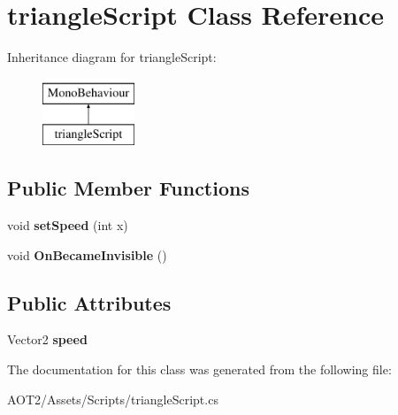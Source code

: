 \hypertarget{classtriangle_script}{}\section{triangle\+Script Class Reference}
\label{classtriangle_script}
Inheritance diagram for triangle\+Script\+:\begin{figure}[H]
\begin{center}
\leavevmode
\includegraphics[height=2.000000cm]{classtriangle_script}
\end{center}
\end{figure}
\subsection*{Public Member Functions}
\begin{DoxyCompactItemize}
\item 
\hypertarget{classtriangle_script_af0cdc29765b1f5485b035e8b025371eb}{}void {\bfseries set\+Speed} (int x)\label{classtriangle_script_af0cdc29765b1f5485b035e8b025371eb}

\item 
\hypertarget{classtriangle_script_a6deb98a0bb688a322a75d03e61e6e5e8}{}void {\bfseries On\+Became\+Invisible} ()\label{classtriangle_script_a6deb98a0bb688a322a75d03e61e6e5e8}

\end{DoxyCompactItemize}
\subsection*{Public Attributes}
\begin{DoxyCompactItemize}
\item 
\hypertarget{classtriangle_script_a6bfdbe74d4572da3bac0362003649747}{}Vector2 {\bfseries speed}\label{classtriangle_script_a6bfdbe74d4572da3bac0362003649747}

\end{DoxyCompactItemize}


The documentation for this class was generated from the following file\+:\begin{DoxyCompactItemize}
\item 
A\+O\+T2/\+Assets/\+Scripts/triangle\+Script.\+cs\end{DoxyCompactItemize}

